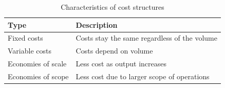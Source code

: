 \begin{table}
\centering
    \begin{tabular}{|l|l|}
        \hline
        \textbf{Type} & \textbf{Description} \\ \hline
       Fixed costs & Costs stay the same regardless of the volume  \\ \hline
       Variable costs & Costs depend on volume \\ \hline
       Economies of scale & Less cost as output increases \\ \hline
	   Economies of scope & Less cost due to larger scope of operations \\ \hline
    \end{tabular}
    \caption[Characteristics of cost structures]{Characteristics of cost structures}
    \label{tab:cost}
\end{table}
